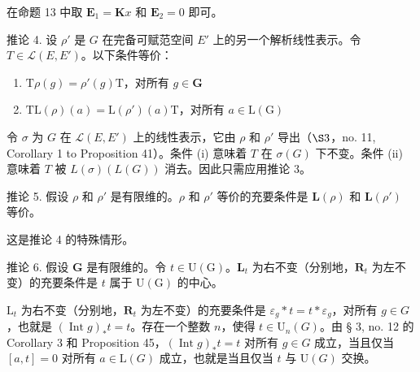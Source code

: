 在命题 13 中取 \(\mathbf{E}_1 = \mathbf{K}x\) 和 \(\mathbf{E}_2 = 0\) 即可。

推论 4. 设 \(\rho'\) 是 \(G\) 在完备可赋范空间 \(E'\) 上的另一个解析线性表示。令 \(T \in \mathcal{L}(E, E')\)。以下条件等价：

\begin{enumerate}
\def\labelenumi{(\roman{enumi})}
\item
  \(\mathrm{T}\rho (g) = \rho '(g)\mathrm{T}\)，对所有 \(g\in \mathbf{G}\)
\item
  \(\mathrm{TL}(\rho)(a) = \mathrm{L}(\rho')(a)\mathrm{T}\)，对所有 \(a\in \mathrm{L}(\mathrm{G})\)
\end{enumerate}

令 \(\sigma\) 为 \(G\) 在 \(\mathcal{L}(E, E')\) 上的线性表示，它由 \(\rho\) 和 \(\rho'\) 导出（\(\S 3\)，no. 11, Corollary 1 to Proposition 41）。条件 (i) 意味着 \(T\) 在 \(\sigma(G)\) 下不变。条件 (ii) 意味着 \(T\) 被 \(L(\sigma)(L(G))\) 消去。因此只需应用推论 3。

推论 5. 假设 \(\rho\) 和 \(\rho'\) 是有限维的。\(\rho\) 和 \(\rho'\) 等价的充要条件是 \(\mathbf{L}(\rho)\) 和 \(\mathbf{L}(\rho')\) 等价。

这是推论 4 的特殊情形。

推论 6. 假设 \(\mathbf{G}\) 是有限维的。令 \(t \in \mathrm{U}(\mathrm{G})\)。\(\mathbf{L}_t\) 为右不变（分别地，\(\mathbf{R}_t\) 为左不变）的充要条件是 \(t\) 属于 \(\mathrm{U}(\mathrm{G})\) 的中心。

\(\mathrm{L}_t\) 为右不变（分别地，\(\mathbf{R}_t\) 为左不变）的充要条件是 \(\varepsilon_g * t = t * \varepsilon_g\)，对所有 \(g \in G\)，也就是 \((\operatorname{Int} g)_* t = t\)。存在一个整数 \(n\)，使得 \(t \in \mathrm{U}_n(G)\)。由 § 3, no. 12 的 Corollary 3 和 Proposition 45，\((\operatorname{Int} g)_* t = t\) 对所有 \(g \in G\) 成立，当且仅当 \([a, t] = 0\) 对所有 \(a \in \mathrm{L}(G)\) 成立，也就是当且仅当 \(t\) 与 \(\mathrm{U}(G)\) 交换。

